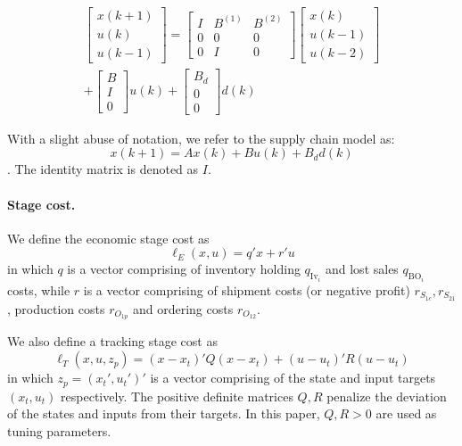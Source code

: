 \documentclass[10pt]{article}
\newcommand{\I}{\mathcal{I}}
\newcommand{\BO}{\textrm{BO}}
\newcommand{\Inv}{\textrm{Iv}}
\theoremstyle{definition}
\begin{document}
\begin{multline}
\label{eq:model}
\begin{bmatrix}x(k+1)\\u(k)\\u(k-1)\end{bmatrix} = 
\begin{bmatrix} I & B^{(1)} & B^{(2)} \\ 0&0 &0 \\0& I &0\end{bmatrix}
\begin{bmatrix}x(k)\\u(k-1)\\u(k-2)\end{bmatrix}\\
+\begin{bmatrix}B\\I\\0\end{bmatrix}u(k) + \begin{bmatrix}B_d\\0 \\0 \end{bmatrix}d(k)
\end{multline}

With a slight abuse of notation, we refer to the supply chain model as:
\[x(k+1) = Ax(k)+Bu(k)+B_dd(k)\]. The identity matrix is denoted as $I$.

\paragraph{Stage cost.} We define the economic stage cost as
\begin{equation}
\label{eq:ellE}
\ell_E(x,u) = q'x + r'u
\end{equation}
in which $q$ is a vector comprising of inventory holding $q_{\Inv_i}$
and lost sales $q_{\BO_i}$ costs, while $r$ is a vector comprising of
shipment costs (or negative profit) $r_{S_{1c}}, r_{S_{21}}$,
production costs $r_{O_{1p}}$ and ordering costs $r_{O_{12}}$. 

We also define a tracking stage cost as
\begin{equation}
\label{eq:ellT}
\ell_T(x,u,z_p) = (x-x_t)'Q(x-x_t)+(u-u_t)'R(u-u_t)
\end{equation}
in which $z_p = (x_t',u_t')'$ is a vector comprising of the state and
input targets $(x_t,u_t)$ respectively. The positive definite matrices
$Q,R$ penalize the deviation of the states and inputs from their
targets. In this paper, $Q,R>0$ are used as tuning parameters.
\end{document}

